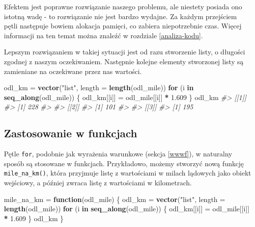 \documentclass[paper=6in:9in,pagesize=pdftex,headinclude=on,footinclude=on,10pt]{scrbook}
\newenvironment{Shaded}{\begin{snugshade}}{\end{snugshade}}
\newcommand{\CommentTok}[1]{\textcolor[rgb]{0.56,0.35,0.01}{\textit{#1}}}
\newcommand{\ControlFlowTok}[1]{\textcolor[rgb]{0.13,0.29,0.53}{\textbf{#1}}}
\newcommand{\DataTypeTok}[1]{\textcolor[rgb]{0.13,0.29,0.53}{#1}}
\newcommand{\FloatTok}[1]{\textcolor[rgb]{0.00,0.00,0.81}{#1}}
\newcommand{\KeywordTok}[1]{\textcolor[rgb]{0.13,0.29,0.53}{\textbf{#1}}}
\newcommand{\NormalTok}[1]{#1}
\newcommand{\OperatorTok}[1]{\textcolor[rgb]{0.81,0.36,0.00}{\textbf{#1}}}
\newcommand{\StringTok}[1]{\textcolor[rgb]{0.31,0.60,0.02}{#1}}
\begin{document}
Efektem jest poprawne rozwiązanie naszego problemu, ale niestety posiada ono istotną wadę - to rozwiązanie nie jest bardzo wydajne.
Za każdym przejściem pętli następuje bowiem alokacja pamięci, co zabiera niepotrzebnie czas.
Więcej informacji na ten temat można znaleźć w rozdziale \ref{analiza-kodu}.

Lepszym rozwiązaniem w takiej sytuacji jest od razu stworzenie listy, o długości zgodnej z naszym oczekiwaniem.
Następnie kolejne elementy stworzonej listy są zamieniane na oczekiwane przez nas wartości.

\begin{Shaded}
\begin{Highlighting}[]
\NormalTok{odl_km =}\StringTok{ }\KeywordTok{vector}\NormalTok{(}\StringTok{"list"}\NormalTok{, }\DataTypeTok{length =} \KeywordTok{length}\NormalTok{(odl_mile))}
\ControlFlowTok{for}\NormalTok{ (i }\ControlFlowTok{in} \KeywordTok{seq_along}\NormalTok{(odl_mile)) \{}
\NormalTok{  odl_km[[i]] =}\StringTok{ }\NormalTok{odl_mile[[i]] }\OperatorTok{*}\StringTok{ }\FloatTok{1.609}
\NormalTok{\}}
\NormalTok{odl_km}
\CommentTok{#> [[1]]}
\CommentTok{#> [1] 228}
\CommentTok{#> }
\CommentTok{#> [[2]]}
\CommentTok{#> [1] 101}
\CommentTok{#> }
\CommentTok{#> [[3]]}
\CommentTok{#> [1] 195}
\end{Highlighting}
\end{Shaded}

\hypertarget{zastosowanie-w-funkcjach}{%
\subsection{Zastosowanie w funkcjach}\label{zastosowanie-w-funkcjach}}

Pętle \texttt{for}, podobnie jak wyrażenia warunkowe (sekcja \ref{wwwf}), w naturalny sposób są stosowane w funkcjach.
Przykładowo, możemy stworzyć nową funkcję \texttt{mile\_na\_km()}, która przyjmuje listę z wartościami w milach lądowych jako obiekt wejściowy, a później zwraca listę z wartościami w kilometrach.

\begin{Shaded}
\begin{Highlighting}[]
\NormalTok{mile_na_km =}\StringTok{ }\ControlFlowTok{function}\NormalTok{(odl_mile) \{}
\NormalTok{  odl_km =}\StringTok{ }\KeywordTok{vector}\NormalTok{(}\StringTok{"list"}\NormalTok{, }\DataTypeTok{length =} \KeywordTok{length}\NormalTok{(odl_mile))}
  \ControlFlowTok{for}\NormalTok{ (i }\ControlFlowTok{in} \KeywordTok{seq_along}\NormalTok{(odl_mile)) \{}
\NormalTok{    odl_km[[i]] =}\StringTok{ }\NormalTok{odl_mile[[i]] }\OperatorTok{*}\StringTok{ }\FloatTok{1.609}
\NormalTok{  \}}
\NormalTok{  odl_km}
\NormalTok{\}}
\end{Highlighting}
\end{Shaded}
\end{document}
